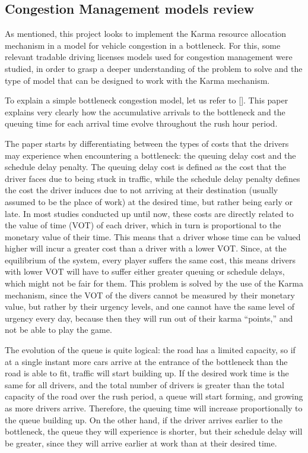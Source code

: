 \documentclass[a4paper,11pt,twoside]{book}
\let\oldcite\cite
\renewcommand*\cite[1]{{[\oldcite{#1}]}}
\begin{document}
\subsection{Congestion Management models review}

As mentioned, this project looks to implement the Karma resource allocation mechanism in a model for vehicle congestion in a bottleneck. For this, some relevant tradable driving licenses models used for congestion management were studied, in order to grasp a deeper understanding of the problem to solve and the type of model that can be designed to work with the Karma mechanism.

To explain a simple bottleneck congestion model, let us refer to \cite{Xiaoetal}. This paper explains very clearly how the accumulative arrivals to the bottleneck and the queuing time for each arrival time evolve throughout the rush hour period.

The paper starts by differentiating between the types of costs that the drivers may experience when encountering a bottleneck: the queuing delay cost and the schedule delay penalty. The queuing delay cost is defined as the cost that the driver faces due to being stuck in traffic, while the schedule delay penalty defines the cost the driver induces due to not arriving at their destination (usually assumed to be the place of work) at the desired time, but rather being early or late. In most studies conducted up until now, these costs are directly related to the value of time (VOT) of each driver, which in turn is proportional to the monetary value of their time. This means that a driver whose time can be valued higher will incur a greater cost than a driver with a lower VOT. Since, at the equilibrium of the system, every player suffers the same cost, this means drivers with lower VOT will have to suffer either greater queuing or schedule delays, which might not be fair for them. This problem is solved by the use of the Karma mechanism, since the VOT of the divers cannot be measured by their monetary value, but rather by their urgency levels, and one cannot have the same level of urgency every day, because then they will run out of their karma ``points,'' and not be able to play the game.

The evolution of the queue is quite logical: the road has a limited capacity, so if at a single instant more cars arrive at the entrance of the bottleneck than the road is able to fit, traffic will start building up. If the desired work time is the same for all drivers, and the total number of drivers is greater than the total capacity of the road over the rush period, a queue will start forming, and growing as more drivers arrive. Therefore, the queuing time will increase proportionally to the queue building up. On the other hand, if the driver arrives earlier to the bottleneck, the queue they will experience is shorter, but their schedule delay will be greater, since they will arrive earlier at work than at their desired time.
\end{document}
